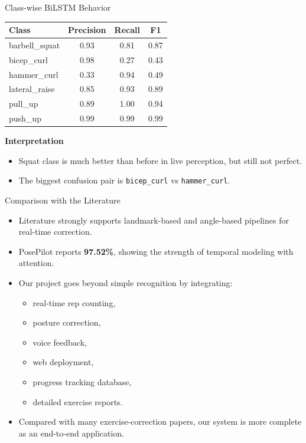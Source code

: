\documentclass[aspectratio=169]{beamer}
\begin{document}
\begin{frame}{Class-wise BiLSTM Behavior}
\small
\begin{tabular}{p{2.6cm} c c c}
\toprule
\textbf{Class} & \textbf{Precision} & \textbf{Recall} & \textbf{F1} \\
\midrule
barbell\_squat & 0.93 & 0.81 & 0.87 \\
bicep\_curl & 0.98 & 0.27 & 0.43 \\
hammer\_curl & 0.33 & 0.94 & 0.49 \\
lateral\_raise & 0.85 & 0.93 & 0.89 \\
pull\_up & 0.89 & 1.00 & 0.94 \\
push\_up & 0.99 & 0.99 & 0.99 \\
\bottomrule
\end{tabular}

\vspace{0.3cm}
\textbf{Interpretation}
\begin{itemize}
  \item Squat class is much better than before in live perception, but still not perfect.
  \item The biggest confusion pair is \texttt{bicep\_curl} vs \texttt{hammer\_curl}.
\end{itemize}
\end{frame}

\begin{frame}{Comparison with the Literature}
\small
\begin{itemize}
  \item Literature strongly supports landmark-based and angle-based pipelines for real-time correction.
  \item PosePilot reports \textbf{97.52\%}, showing the strength of temporal modeling with attention.
  \item Our project goes beyond simple recognition by integrating:
  \begin{itemize}
    \item real-time rep counting,
    \item posture correction,
    \item voice feedback,
    \item web deployment,
    \item progress tracking database,
    \item detailed exercise reports.
  \end{itemize}
  \item Compared with many exercise-correction papers, our system is more complete as an end-to-end application.
\end{itemize}
\end{frame}
\end{document}
